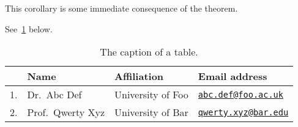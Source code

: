 \begin{corollary}
  This corollary is some immediate consequence of the theorem.
\end{corollary}

\begin{remark}
  \lipsum[1-2]
\end{remark}

\begin{example}
  \lipsum[5]
\end{example}

See~\cref{table} below.
\begin{table}[h]%
  \centering
  \begin{tabular}{llp{4cm}l}\toprule
    & Name & Affiliation & Email address \\\midrule
    1. & Dr.~Abc Def
       & University of Foo
       & \href{mailto:abc.def@foo.ac.uk}{\texttt{abc.def@foo.ac.uk}} \\
    2. & Prof.~Qwerty Xyz
       & University of Bar
       & \href{mailto:qwerty.xyz@bar.ac.uk}{\texttt{qwerty.xyz@bar.edu}}
  \end{tabular}
  \caption{The caption of a table.}
  \label{table}
\end{table}


